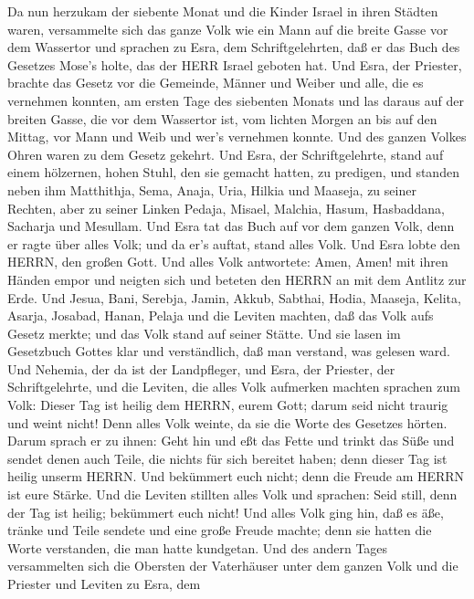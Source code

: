  Da nun herzukam der siebente Monat und die Kinder Israel in
ihren Städten waren, versammelte sich das ganze Volk wie ein Mann auf
die breite Gasse vor dem Wassertor und sprachen zu Esra, dem
Schriftgelehrten, daß er das Buch des Gesetzes Mose's holte, das der
HERR Israel geboten hat.  Und Esra, der Priester, brachte
das Gesetz vor die Gemeinde, Männer und Weiber und alle, die es
vernehmen konnten, am ersten Tage des siebenten Monats  und
las daraus auf der breiten Gasse, die vor dem Wassertor ist, vom lichten
Morgen an bis auf den Mittag, vor Mann und Weib und wer's vernehmen
konnte. Und des ganzen Volkes Ohren waren zu dem Gesetz gekehrt.
 Und Esra, der Schriftgelehrte, stand auf einem hölzernen,
hohen Stuhl, den sie gemacht hatten, zu predigen, und standen neben ihm
Matthithja, Sema, Anaja, Uria, Hilkia und Maaseja, zu seiner Rechten,
aber zu seiner Linken Pedaja, Misael, Malchia, Hasum, Hasbaddana,
Sacharja und Mesullam.  Und Esra tat das Buch auf vor dem
ganzen Volk, denn er ragte über alles Volk; und da er's auftat, stand
alles Volk.  Und Esra lobte den HERRN, den großen Gott. Und
alles Volk antwortete: Amen, Amen! mit ihren Händen empor und neigten
sich und beteten den HERRN an mit dem Antlitz zur Erde.  Und
Jesua, Bani, Serebja, Jamin, Akkub, Sabthai, Hodia, Maaseja, Kelita,
Asarja, Josabad, Hanan, Pelaja und die Leviten machten, daß das Volk
aufs Gesetz merkte; und das Volk stand auf seiner Stätte. 
Und sie lasen im Gesetzbuch Gottes klar und verständlich, daß man
verstand, was gelesen ward.  Und Nehemia, der da ist der
Landpfleger, und Esra, der Priester, der Schriftgelehrte, und die
Leviten, die alles Volk aufmerken machten sprachen zum Volk: Dieser Tag
ist heilig dem HERRN, eurem Gott; darum seid nicht traurig und weint
nicht! Denn alles Volk weinte, da sie die Worte des Gesetzes hörten.
 Darum sprach er zu ihnen: Geht hin und eßt das Fette und
trinkt das Süße und sendet denen auch Teile, die nichts für sich
bereitet haben; denn dieser Tag ist heilig unserm HERRN. Und bekümmert
euch nicht; denn die Freude am HERRN ist eure Stärke.  Und
die Leviten stillten alles Volk und sprachen: Seid still, denn der Tag
ist heilig; bekümmert euch nicht!  Und alles Volk ging hin,
daß es äße, tränke und Teile sendete und eine große Freude machte; denn
sie hatten die Worte verstanden, die man hatte kundgetan. 
Und des andern Tages versammelten sich die Obersten der Vaterhäuser
unter dem ganzen Volk und die Priester und Leviten zu Esra, dem
